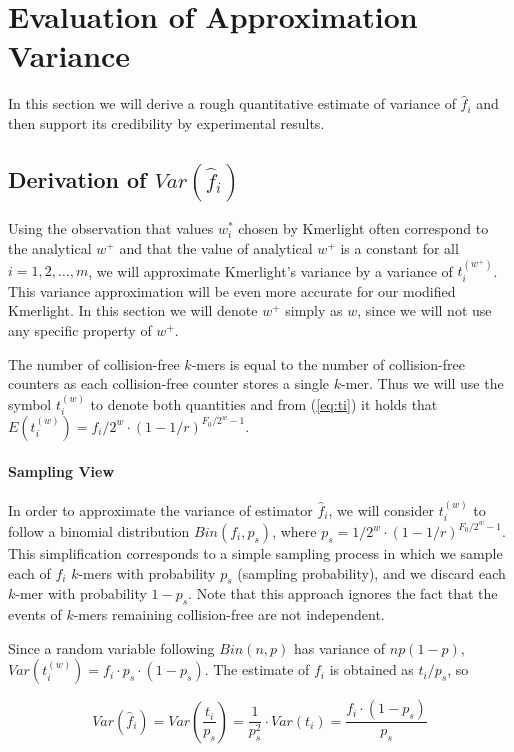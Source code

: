 \section{Evaluation of Approximation Variance}
\label{sec:estimation-variance}

In this section we will derive a rough quantitative estimate of variance of $ \hat f_i$
and then support its credibility by experimental results.

\subsection{Derivation of $Var(\hat f_i)$}
Using the observation that values $w_i^*$ chosen by Kmerlight often correspond
to the analytical $w^+$ and that the value of analytical $w^+$ is a constant
for all $i=1, 2, \dots, m$, we will approximate Kmerlight's variance by a variance
of $t_i^{(w^+)}$. This variance approximation will be even more accurate for our modified
Kmerlight. In this section we will denote
$w^+$ simply as $w$, since we will not use any specific property of $w^+$.

The number of collision-free $k$-mers is equal to the number of collision-free counters
as each collision-free counter stores a single $k$-mer. Thus we will use the symbol
$t_i^{(w)}$ to denote both quantities and  from (\ref{eq:ti}) it holds that 
$E(t_i^{(w)}) = f_i/2^w \cdot (1 - 1/r)^{F_0/2^w-1}$.

\paragraph{Sampling View}
In order to approximate the variance of estimator $\hat f_i$, we will consider
$t_i^{(w)}$ to follow a binomial distribution $Bin(f_i, p_s)$, where
$p_s = 1/2^w \cdot (1 - 1/r)^{F_0/2^w-1}$.
This simplification corresponds to a simple sampling process in which we sample each of $f_i$ 
$k$-mers with probability $p_s$ (sampling probability), and we discard each $k$-mer
with probability $1 - p_s$. Note that this approach ignores the fact that the events
of $k$-mers remaining collision-free are not independent. 

Since a random variable following $Bin(n, p)$ has variance of $np(1-p)$, 
$Var(t_i^{(w)}) = f_i \cdot p_s \cdot (1-p_s)$. The estimate of $f_i$ is obtained
as $t_i / p_s$, so

\begin{equation} \label{eq:varhatfi}
Var(\hat f_i) = Var \left( \frac{t_i}{p_s} \right) = \frac{1}{p_s^2}
\cdot Var(t_i) = \frac{f_i \cdot (1 - p_s)}{p_s}
\end{equation}

